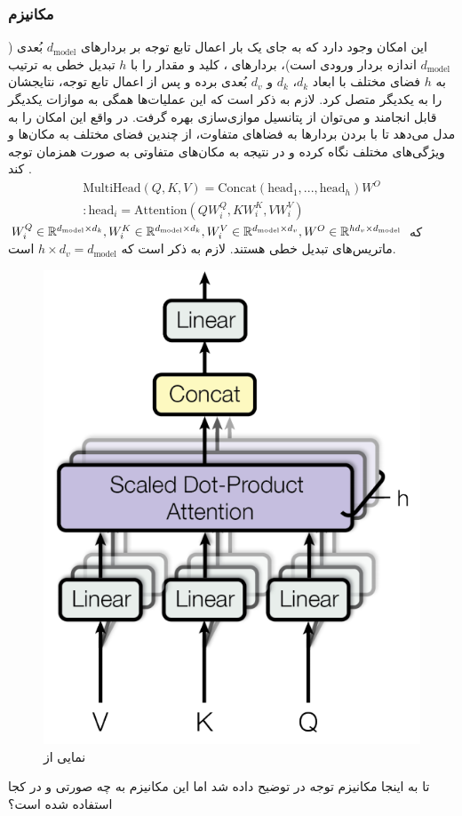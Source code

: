 \subsubsection{مکانیزم \multiheadattention{}}
این امکان وجود دارد که به جای یک بار اعمال تابع توجه بر بردارهای $d_\text{model}$ بُعدی ($d_\text{model}$ اندازه بردار ورودی است)، بردارهای \query{}، کلید و مقدار را با $h$ تبدیل خطی به ترتیب به $h$ فضای مختلف با ابعاد $d_k$، $d_k$ و $d_v$ بُعدی برده و پس از اعمال تابع توجه، نتایجشان را به یکدیگر متصل کرد. لازم به ذکر است که این عملیات‌ها همگی به موازات یکدیگر  قابل انجامند و می‌توان از پتانسیل موازی‌سازی \gpu{} بهره گرفت. در واقع \multiheadattention{} این امکان را به مدل می‌دهد تا با بردن بردارها به فضاهای متفاوت، از چندین فضای مختلف به مکان‌ها و ویژگی‌های مختلف نگاه کرده و در نتیجه به مکان‌های متفاوتی به صورت همزمان توجه کند \cite{transformer}.
\begin{gather}
\text{MultiHead}(Q, K, V) = \text{Concat}(\text{head}_1, ..., \text{head}_h)W^O \nonumber
\\
: \text{head}_i = \text{Attention}(QW_i^Q, KW_i^K, VW_i^V)
\end{gather}
که
$W_i^Q \in {\mathbb{R}}^{d_\text{model} \times d_k},
W_i^K \in {\mathbb{R}}^{d_\text{model} \times d_k},
W_i^V \in {\mathbb{R}}^{d_\text{model} \times d_v},
W^O \in {\mathbb{R}}^{hd_v \times d_\text{model}}$
ماتریس‌های تبدیل خطی هستند. لازم به ذکر است که $h \times d_v = d_\text{model}$ است.
\begin{figure}[H]
    \centering
    \includegraphics[width=.4
    \textwidth]{images/attention2.png}
    \caption{نمایی از \multiheadattention{}}
\end{figure}
تا به اینجا مکانیزم توجه در \transformer{} توضیح داده شد اما این مکانیزم به چه صورتی و در کجا استفاده شده است؟
